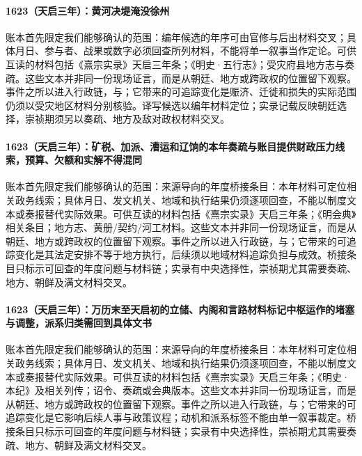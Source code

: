 \paragraph{1623（天启三年）：黄河决堤淹没徐州} 账本首先限定我们能够确认的范围：编年候选的年序可由官修与后出材料交叉；具体月日、参与者、战果或数字必须回查所列材料，不能将单一叙事当作定论。可供互读的材料包括《熹宗实录》天启三年条；《明史·五行志》；受灾府县地方志与奏疏。这些文本并非同一份现场证言，而是从朝廷、地方或跨政权的位置留下观察。事件之所以进入行政链，与；它带来的可追踪变化是赈济、迁徙和损失的实际范围仍须以受灾地区材料分别核验。译写候选以编年材料定位；实录记载反映朝廷选择，崇祯期须另以奏疏、地方及敌对政权材料交叉。

\paragraph{1623（天启三年）：矿税、加派、漕运和辽饷的本年奏疏与账目提供财政压力线索，预算、欠额和实解不得混同} 账本首先限定我们能够确认的范围：来源导向的年度桥接条目：本年材料可定位相关政务线索；具体月日、发文机关、地域和执行结果仍须逐项回查，不能以制度文本或奏报替代实际效果。可供互读的材料包括《熹宗实录》天启三年条；《明会典》相关条目；地方志、黄册/契约/河工材料。这些文本并非同一份现场证言，而是从朝廷、地方或跨政权的位置留下观察。事件之所以进入行政链，与；它带来的可追踪变化是其法定安排不等于地方执行，后续须以地域材料追踪负担与成效。桥接条目只标示可回查的年度问题与材料链；实录有中央选择性，崇祯期尤其需要奏疏、地方、朝鲜及满文材料交叉。

\paragraph{1623（天启三年）：万历末至天启初的立储、内阁和言路材料标记中枢运作的堵塞与调整，派系归类需回到具体文书} 账本首先限定我们能够确认的范围：来源导向的年度桥接条目：本年材料可定位相关政务线索；具体月日、发文机关、地域和执行结果仍须逐项回查，不能以制度文本或奏报替代实际效果。可供互读的材料包括《熹宗实录》天启三年条；《明史·本纪》及相关列传；诏令、奏疏或会典版本。这些文本并非同一份现场证言，而是从朝廷、地方或跨政权的位置留下观察。事件之所以进入行政链，与；它带来的可追踪变化是它影响后续人事与政策议程；动机和派系标签不能由单一叙事裁定。桥接条目只标示可回查的年度问题与材料链；实录有中央选择性，崇祯期尤其需要奏疏、地方、朝鲜及满文材料交叉。

